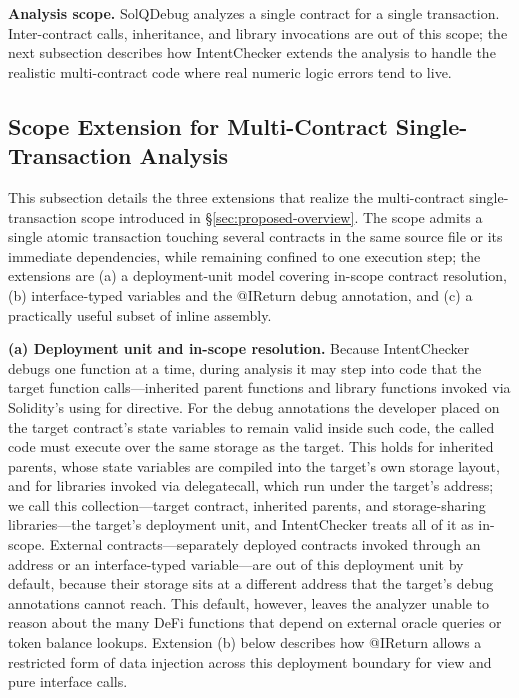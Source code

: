 \documentclass[pdflatex,sn-basic]{sn-jnl}%
\theoremstyle{thmstyleone}%
\theoremstyle{thmstyletwo}%
\theoremstyle{thmstylethree}%
\begin{document}
\smallskip
\noindent\textbf{Analysis scope.}
SolQDebug analyzes a single contract for a single transaction.
Inter-contract calls, inheritance, and library invocations are out of this scope; the next subsection describes how IntentChecker extends the analysis to handle the realistic multi-contract code where real numeric logic errors tend to live.

\subsection{Scope Extension for Multi-Contract Single-Transaction Analysis}\label{sec:prelim:extension}

This subsection details the three extensions that realize the multi-contract single-transaction scope introduced in §\ref{sec:proposed-overview}.
The scope admits a single atomic transaction touching several contracts in the same source file or its immediate dependencies, while remaining confined to one execution step; the extensions are (a) a deployment-unit model covering in-scope contract resolution, (b) interface-typed variables and the @IReturn debug annotation, and (c) a practically useful subset of inline assembly.

\smallskip
\noindent\textbf{(a) Deployment unit and in-scope resolution.}
Because IntentChecker debugs one function at a time, during analysis it may step into code that the target function calls---inherited parent functions and library functions invoked via Solidity's using for directive.
For the debug annotations the developer placed on the target contract's state variables to remain valid inside such code, the called code must execute over the same storage as the target.
This holds for inherited parents, whose state variables are compiled into the target's own storage layout, and for libraries invoked via delegatecall, which run under the target's address;
we call this collection---target contract, inherited parents, and storage-sharing libraries---the target's deployment unit, and IntentChecker treats all of it as in-scope.
External contracts---separately deployed contracts invoked through an address or an interface-typed variable---are out of this deployment unit by default, because their storage sits at a different address that the target's debug annotations cannot reach.
This default, however, leaves the analyzer unable to reason about the many DeFi functions that depend on external oracle queries or token balance lookups.
Extension (b) below describes how @IReturn allows a restricted form of data injection across this deployment boundary for view and pure interface calls.
\end{document}
